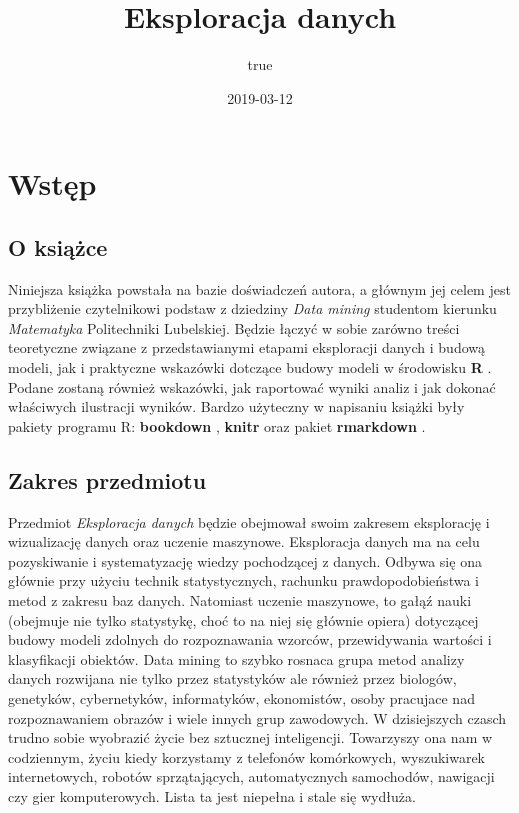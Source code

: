 \documentclass[]{book}
\title{Eksploracja danych}
\author{true}
\date{2019-03-12}
\theoremstyle{plain}
\theoremstyle{definition}
\begin{document}
\maketitle

{
\setcounter{tocdepth}{1}
\tableofcontents
}
\hypertarget{wstep}{%
\chapter*{Wstęp}\label{wstep}}

\hypertarget{o-ksiazce}{%
\section*{O książce}\label{o-ksiazce}}

Niniejsza książka powstała na bazie doświadczeń autora, a głównym jej celem jest przybliżenie czytelnikowi podstaw z dziedziny \emph{Data mining} studentom kierunku \emph{Matematyka} Politechniki Lubelskiej. Będzie łączyć w sobie zarówno treści teoretyczne związane z przedstawianymi etapami eksploracji danych i budową modeli, jak i praktyczne wskazówki dotczące budowy modeli w środowisku \textbf{R} \citep{R-base}. Podane zostaną również wskazówki, jak raportować wyniki analiz i jak dokonać właściwych ilustracji wyników. Bardzo użyteczny w napisaniu książki były pakiety programu R: \textbf{bookdown} \citep{R-bookdown}, \textbf{knitr} \citep{R-knitr} oraz pakiet \textbf{rmarkdown} \citep{R-rmarkdown}.

\hypertarget{zakres-przedmiotu}{%
\section*{Zakres przedmiotu}\label{zakres-przedmiotu}}

Przedmiot \emph{Eksploracja danych} będzie obejmował swoim zakresem eksplorację i wizualizację danych oraz uczenie maszynowe. Eksploracja danych ma na celu pozyskiwanie i systematyzację wiedzy pochodzącej z danych. Odbywa się ona głównie przy użyciu technik statystycznych, rachunku prawdopodobieństwa i metod z zakresu baz danych. Natomiast uczenie maszynowe, to gałąź nauki (obejmuje nie tylko statystykę, choć to na niej się głównie opiera) dotyczącej budowy modeli zdolnych do rozpoznawania wzorców, przewidywania wartości i klasyfikacji obiektów. Data mining to szybko rosnaca grupa metod analizy danych rozwijana nie tylko przez statystyków ale również przez biologów, genetyków, cybernetyków, informatyków, ekonomistów, osoby pracujace nad rozpoznawaniem obrazów i wiele innych grup zawodowych. W dzisiejszych czasch trudno sobie wyobrazić życie bez sztucznej inteligencji. Towarzyszy ona nam w codziennym, życiu kiedy korzystamy z telefonów komórkowych, wyszukiwarek internetowych, robotów sprzątających, automatycznych samochodów, nawigacji czy gier komputerowych. Lista ta jest niepełna i stale się wydłuża.
\end{document}
